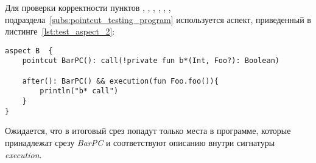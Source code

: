  Для проверки корректности пунктов
 \quotes{\ref{list:method_name_check}},
 \quotes{\ref{list:class_name_check}},
 \quotes{\ref{list:method_modifiers_check}},
 \quotes{\ref{list:method_return_value_check}},
 \quotes{\ref{list:execution_check}},
 \quotes{\ref{list:reference_pointcut_check}},
 \quotes{\ref{list:logic_operations_check}} подраздела~\ref{subs:pointcut_testing_program} используется аспект, приведенный в листинге~\ref{lst:test_aspect_2}:
\begin{lstlisting}[style={java}, label={lst:test_aspect_2},
  caption={Пример тестового аспекта}]
aspect B  {
    pointcut BarPC(): call(!private fun b*(Int, Foo?): Boolean)

    after(): BarPC() && execution(fun Foo.foo()){
        println("b* call")
    }
}
\end{lstlisting}

Ожидается, что в итоговый срез попадут только места в программе, которые принадлежат срезу \textit{BarPC} и соответствуют описанию внутри сигнатуры \textit{execution}.

